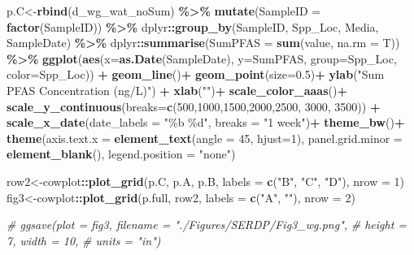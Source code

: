 \documentclass[
]{article}
\newenvironment{Shaded}{\begin{snugshade}}{\end{snugshade}}
\newcommand{\AttributeTok}[1]{\textcolor[rgb]{0.13,0.29,0.53}{#1}}
\newcommand{\CommentTok}[1]{\textcolor[rgb]{0.56,0.35,0.01}{\textit{#1}}}
\newcommand{\DecValTok}[1]{\textcolor[rgb]{0.00,0.00,0.81}{#1}}
\newcommand{\FloatTok}[1]{\textcolor[rgb]{0.00,0.00,0.81}{#1}}
\newcommand{\FunctionTok}[1]{\textcolor[rgb]{0.13,0.29,0.53}{\textbf{#1}}}
\newcommand{\NormalTok}[1]{#1}
\newcommand{\OtherTok}[1]{\textcolor[rgb]{0.56,0.35,0.01}{#1}}
\newcommand{\SpecialCharTok}[1]{\textcolor[rgb]{0.81,0.36,0.00}{\textbf{#1}}}
\newcommand{\StringTok}[1]{\textcolor[rgb]{0.31,0.60,0.02}{#1}}
\begin{document}
\begin{Shaded}
\begin{Highlighting}[]
\NormalTok{p.C}\OtherTok{\textless{}{-}}\FunctionTok{rbind}\NormalTok{(d\_wg\_wat\_noSum) }\SpecialCharTok{\%\textgreater{}\%} 
  \FunctionTok{mutate}\NormalTok{(}\AttributeTok{SampleID =} \FunctionTok{factor}\NormalTok{(SampleID)) }\SpecialCharTok{\%\textgreater{}\%} 
\NormalTok{  dplyr}\SpecialCharTok{::}\FunctionTok{group\_by}\NormalTok{(SampleID, Spp\_Loc, Media, SampleDate) }\SpecialCharTok{\%\textgreater{}\%} 
\NormalTok{  dplyr}\SpecialCharTok{::}\FunctionTok{summarise}\NormalTok{(}\AttributeTok{SumPFAS =} \FunctionTok{sum}\NormalTok{(value, }\AttributeTok{na.rm =}\NormalTok{ T)) }\SpecialCharTok{\%\textgreater{}\%} 
    \FunctionTok{ggplot}\NormalTok{(}\FunctionTok{aes}\NormalTok{(}\AttributeTok{x=}\FunctionTok{as.Date}\NormalTok{(SampleDate), }\AttributeTok{y=}\NormalTok{SumPFAS, }\AttributeTok{group=}\NormalTok{Spp\_Loc, }\AttributeTok{color=}\NormalTok{Spp\_Loc)) }\SpecialCharTok{+}
    \FunctionTok{geom\_line}\NormalTok{()}\SpecialCharTok{+}
    \FunctionTok{geom\_point}\NormalTok{(}\AttributeTok{size=}\FloatTok{0.5}\NormalTok{)}\SpecialCharTok{+}
    \FunctionTok{ylab}\NormalTok{(}\StringTok{"Sum PFAS Concentration (ng/L)"}\NormalTok{) }\SpecialCharTok{+}
    \FunctionTok{xlab}\NormalTok{(}\StringTok{""}\NormalTok{)}\SpecialCharTok{+}
    \FunctionTok{scale\_color\_aaas}\NormalTok{()}\SpecialCharTok{+}
    \FunctionTok{scale\_y\_continuous}\NormalTok{(}\AttributeTok{breaks=}\FunctionTok{c}\NormalTok{(}\DecValTok{500}\NormalTok{,}\DecValTok{1000}\NormalTok{,}\DecValTok{1500}\NormalTok{,}\DecValTok{2000}\NormalTok{,}\DecValTok{2500}\NormalTok{, }\DecValTok{3000}\NormalTok{, }\DecValTok{3500}\NormalTok{)) }\SpecialCharTok{+}
    \FunctionTok{scale\_x\_date}\NormalTok{(}\AttributeTok{date\_labels =} \StringTok{"\%b \%d"}\NormalTok{, }\AttributeTok{breaks =} \StringTok{"1 week"}\NormalTok{)}\SpecialCharTok{+}
    \FunctionTok{theme\_bw}\NormalTok{()}\SpecialCharTok{+}
    \FunctionTok{theme}\NormalTok{(}\AttributeTok{axis.text.x =} \FunctionTok{element\_text}\NormalTok{(}\AttributeTok{angle =} \DecValTok{45}\NormalTok{, }\AttributeTok{hjust=}\DecValTok{1}\NormalTok{),}
          \AttributeTok{panel.grid.minor =} \FunctionTok{element\_blank}\NormalTok{(),}
          \AttributeTok{legend.position =} \StringTok{"none"}\NormalTok{)}

\NormalTok{row2}\OtherTok{\textless{}{-}}\NormalTok{cowplot}\SpecialCharTok{::}\FunctionTok{plot\_grid}\NormalTok{(p.C, p.A, p.B,  }
                   \AttributeTok{labels =} \FunctionTok{c}\NormalTok{(}\StringTok{"B"}\NormalTok{, }\StringTok{"C"}\NormalTok{, }\StringTok{"D"}\NormalTok{),}
                   \AttributeTok{nrow =} \DecValTok{1}\NormalTok{)}
\NormalTok{fig3}\OtherTok{\textless{}{-}}\NormalTok{cowplot}\SpecialCharTok{::}\FunctionTok{plot\_grid}\NormalTok{(p.full, row2, }
                   \AttributeTok{labels =} \FunctionTok{c}\NormalTok{(}\StringTok{"A"}\NormalTok{, }\StringTok{""}\NormalTok{),}
                   \AttributeTok{nrow =} \DecValTok{2}\NormalTok{)}

\CommentTok{\# ggsave(plot = fig3, filename = "./Figures/SERDP/Fig3\_wg.png",}
\CommentTok{\#        height = 7, width = 10,}
\CommentTok{\#        units = "in")}
\end{Highlighting}
\end{Shaded}
\end{document}
